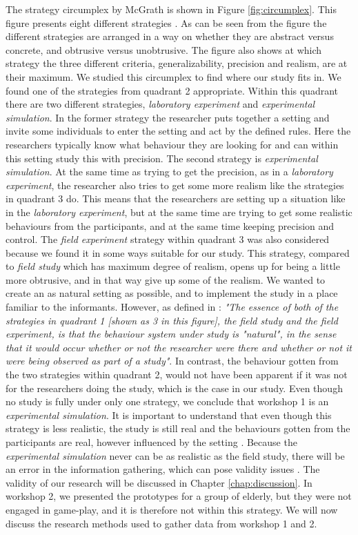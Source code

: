 The strategy circumplex by McGrath is shown in Figure \ref{fig:circumplex}. This figure presents eight different strategies \cite{McGrath}. As can be seen from the figure the different strategies are arranged in a way on whether they are abstract versus concrete, and obtrusive versus unobtrusive. The figure also shows at which strategy the three different criteria, generalizability, precision and realism, are at their maximum. We studied this circumplex to find where our study fits in. We found one of the strategies from quadrant 2 appropriate. Within this quadrant there are two different strategies, \emph{laboratory experiment} and \emph{experimental simulation}. In the former strategy the researcher puts together a setting and invite some individuals to enter the setting and act by the defined rules. Here the researchers typically know what behaviour they are looking for and can within this setting study this with precision. The second strategy is \emph{experimental simulation}. At the same time as trying to get the precision, as in a \emph{laboratory experiment}, the researcher also tries to get some more realism like the strategies in quadrant 3 do. This means that the researchers are setting up a situation like in the \emph{laboratory experiment}, but at the same time are trying to get some realistic behaviours from the participants, and at the same time keeping precision and control. The \emph{field experiment} strategy within quadrant 3 was also considered because we found it in some ways suitable for our study. This strategy, compared to \emph{field study} which has maximum degree of realism, opens up for being a little more obtrusive, and in that way give up some of the realism. We wanted to create an as natural setting as possible, and to implement the study in a place familiar to the informants. However, as defined in \cite{McGrath}: \emph{"The essence of both of the strategies in quadrant 1 [shown as 3 in this figure], the field study and the field experiment, is that the behaviour system under study is "natural", in the sense that it would occur whether or not the researcher were there and whether or not it were being observed as part of a study"}. In contrast, the behaviour gotten from the two strategies within quadrant 2, would not have been apparent if it was not for the researchers doing the study, which is the case in our study. Even though no study is fully under only one strategy, we conclude that workshop 1 is an \emph{experimental simulation}. It is important to understand that even though this strategy is less realistic, the study is still real and the behaviours gotten from the participants are real, however influenced by the setting \cite{McGrath}. Because the \emph{experimental simulation} never can be as realistic as the field study, there will be an error in the information gathering, which can pose validity issues \cite{alsos}. The validity of our research will be discussed in Chapter \ref{chap:discussion}. In workshop 2, we presented the prototypes for a group of elderly, but they were not engaged in game-play, and it is therefore not within this strategy. We will now discuss the research methods used to gather data from workshop 1 and 2.

